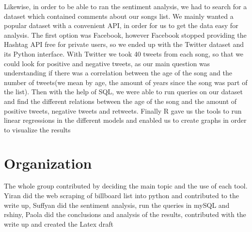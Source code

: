 \documentclass{article}
\begin{document}
Likewise, in order to be able to ran the sentiment analysis, we had to search for a dataset which contained comments about our songs list. We mainly wanted a popular dataset with a convenient API, in order for us to get the data easy for analysis. The first option was Facebook, however Facebook stopped providing the Hashtag API free for private users, so we ended up with the Twitter dataset and its Python interface. With Twitter we took 40 tweets from each song, so that we could look for positive and negative tweets, as our main question was understanding if there was a correlation between the age of the song and the number of tweets(we mean by  age, the amount of years since the song was part of the list).  Then with the help of SQL, we were able to run queries on our dataset and find the different relations between the age of the song and the amount of positive tweets, negative tweets and retweets. Finally R gave us the tools to run linear regressions in the different models and enabled us to create graphs in order to visualize the results


\section{Organization}

The whole group contributed by deciding the main topic and the use of each tool.  Yiran did the web scraping of billboard list into python and contributed to the write up, Suffyan did the sentiment analysis, run the queries in mySQL and rshiny, Paola did the conclusions and analysis of the results, contributed with the write up and created the Latex draft
\end{document}
